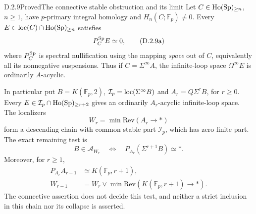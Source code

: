 \begin{claim}{D.2.9}{Proved}{The connective stable obstruction and its limit}
Let $C\in\operatorname{Ho}(\mathrm{Sp})_{\geq n}$, $n\geq1$, have $p$-primary integral
homology and $H_n(C;\mathbb F_p)\neq0$. Every
$E\in\operatorname{loc}(C)\cap\operatorname{Ho}(\mathrm{Sp})_{\geq n}$ satisfies
\[
 P_C^{\mathrm{Sp}}E\simeq0,
 \tag{D.2.9a}
\]
where $P_C^{\mathrm{Sp}}$ is spectral nullification using the mapping
\emph{space} out of $C$, equivalently all its nonnegative
suspensions. Thus if $C=\Sigma^\infty A$, the infinite-loop space
$\Omega^\infty E$ is ordinarily $A$-acyclic.

In particular put $B=K(\mathbb F_p,2)$,
$\mathcal I_p=\operatorname{loc}(\Sigma^\infty B)$ and
$A_r=Q\Sigma^rB$, for $r\geq0$. Every
$E\in\mathcal I_p\cap\operatorname{Ho}(\mathrm{Sp})_{\geq r+2}$ gives an ordinarily
$A_r$-acyclic infinite-loop space. The localizers
\[
 W_r=\min\mathrm{Rev}(A_r\to *)
\]
form a descending chain with common stable part $\mathcal I_p$,
which has zero finite part. The exact remaining test is
\[
 B\in\mathcal A_{W_r}
 \quad\Longleftrightarrow\quad
 P_{A_r}(\Sigma^{r+1}B)\simeq *.
 \tag{D.2.9b}
\]
Moreover, for $r\geq1$,
\[
 \begin{aligned}
 P_{A_r}A_{r-1}&\simeq K(\mathbb F_p,r+1),\\
 W_{r-1}&=W_r\vee
   \min\mathrm{Rev}(K(\mathbb F_p,r+1)\to *).
 \end{aligned}
 \tag{D.2.9c}
\]
The connective assertion does not decide this test, and neither a
strict inclusion in this chain nor its collapse is asserted.
\end{claim}

